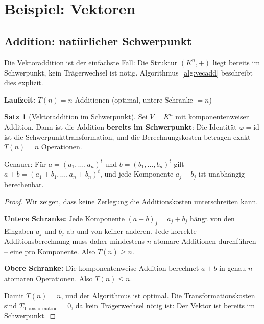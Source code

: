 ﻿\documentclass[a4paper,12pt]{report}
\theoremstyle{definition}
\newtheorem{satz}{Satz}
\begin{document}
\section{Beispiel: Vektoren}

\subsection*{Addition: natürlicher Schwerpunkt}

Die Vektoraddition ist der einfachste Fall: Die Struktur $(K^n, +)$ liegt bereits im Schwerpunkt, kein Trägerwechsel ist nötig. Algorithmus~\ref{alg:vecadd} beschreibt dies explizit.


\begin{algorithm}[H]
\DontPrintSemicolon
\caption{Vektoraddition (im Schwerpunkt)}\label{alg:vecadd}
\;
\BlankLine
\textbf{Laufzeit:} $T(n) = n$ Additionen \quad (optimal, untere Schranke $= n$)
\end{algorithm}


\begin{satz}[Vektoraddition im Schwerpunkt]
    Sei $V = K^n$ mit komponentenweiser Addition. Dann ist
    die Addition \textbf{bereits im Schwerpunkt}: Die Identität
    $\varphi = \mathrm{id}$ ist die Schwerpunkttransformation,
    und die Berechnungskosten betragen exakt $T(n) = n$ Operationen.

    Genauer: Für $a = (a_1, \ldots, a_n)^t$ und $b = (b_1, \ldots, b_n)^t$
    gilt $a + b = (a_1 + b_1, \ldots, a_n + b_n)^t$, und jede Komponente
    $a_j + b_j$ ist unabhängig berechenbar.
\end{satz}

\begin{proof}
    Wir zeigen, dass keine Zerlegung die Additionskosten unterschreiten kann.

    \textbf{Untere Schranke:} Jede Komponente $(a+b)_j = a_j + b_j$
    hängt von den Eingaben $a_j$ und $b_j$ ab und von keiner anderen.
    Jede korrekte Additionsberechnung muss daher mindestens $n$ atomare
    Additionen durchführen -- eine pro Komponente.
    Also $T(n) \geq n$.

    \textbf{Obere Schranke:} Die komponentenweise Addition berechnet
    $a + b$ in genau $n$ atomaren Operationen.
    Also $T(n) \leq n$.

    Damit $T(n) = n$, und der Algorithmus ist optimal.
    Die Transformationskosten sind $T_{\mathrm{Transformation}} = 0$,
    da kein Trägerwechsel nötig ist: Der Vektor ist bereits im Schwerpunkt.
\end{proof}
\end{document}
